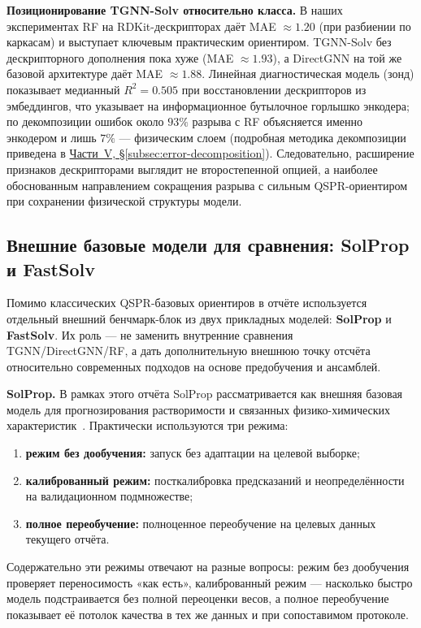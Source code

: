\documentclass[11pt]{article}
\begin{document}
\textbf{Позиционирование TGNN-Solv относительно класса.} В наших экспериментах RF на RDKit-дескрипторах даёт MAE $\approx 1.20$ (при разбиении по каркасам) и выступает ключевым практическим ориентиром. TGNN-Solv без дескрипторного дополнения пока хуже (MAE $\approx 1.93$), а DirectGNN на той же базовой архитектуре даёт MAE $\approx 1.88$. Линейная диагностическая модель (зонд) показывает медианный $R^2=0.505$ при восстановлении дескрипторов из эмбеддингов, что указывает на информационное бутылочное горлышко энкодера; по декомпозиции ошибок около $93\%$ разрыва с RF объясняется именно энкодером и лишь $7\%$ --- физическим слоем (подробная методика декомпозиции приведена в \hyperref[subsec:error-decomposition]{Части~V, §\ref*{subsec:error-decomposition}}). Следовательно, расширение признаков дескрипторами выглядит не второстепенной опцией, а наиболее обоснованным направлением сокращения разрыва с сильным QSPR-ориентиром при сохранении физической структуры модели.

\subsection{Внешние базовые модели для сравнения: SolProp и FastSolv}

Помимо классических QSPR-базовых ориентиров в отчёте используется отдельный внешний бенчмарк-блок из двух прикладных моделей: \textbf{SolProp} и \textbf{FastSolv}. Их роль --- не заменить внутренние сравнения TGNN/DirectGNN/RF, а дать дополнительную внешнюю точку отсчёта относительно современных подходов на основе предобучения и ансамблей.

\textbf{SolProp.} В рамках этого отчёта SolProp рассматривается как внешняя базовая модель для прогнозирования растворимости и связанных физико-химических характеристик~\cite{solprop2024}. Практически используются три режима:
\begin{enumerate}
  \item \textbf{режим без дообучения:} запуск без адаптации на целевой выборке;
  \item \textbf{калиброванный режим:} посткалибровка предсказаний и неопределённости на валидационном подмножестве;
  \item \textbf{полное переобучение:} полноценное переобучение на целевых данных текущего отчёта.
\end{enumerate}

Содержательно эти режимы отвечают на разные вопросы: режим без дообучения проверяет переносимость «как есть», калиброванный режим --- насколько быстро модель подстраивается без полной переоценки весов, а полное переобучение показывает её потолок качества в тех же данных и при сопоставимом протоколе.
\end{document}
